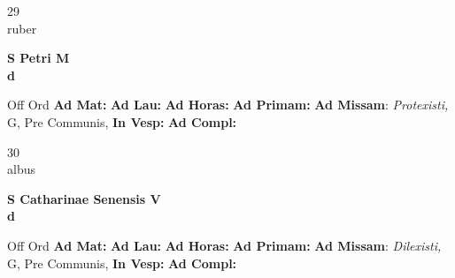 \documentclass[10pt, openany]{book}
\begin{document}
    \begin{center}
        \begin{minipage}{3.5in}
            \vspace{2em}
            \begin{minipage}{0.5in}
                {\Huge 29} \\
                {\normalsize ruber}
            \end{minipage}
            \begin{minipage}{3.0in}
                \textbf{ \large S Petri M \\
                \textnormal{\normalsize d}}

            \end{minipage}
            \begin{justify}Off Ord
                \textbf{Ad Mat: }
                \textbf{Ad Lau: }
                \textbf{Ad Horas: }
                \textbf{Ad Primam: }\textbf{Ad Missam}: \textit{Protexisti,} G, Pre Communis, 
                \textbf{In Vesp: }
                \textbf{Ad Compl: }
            \end{justify}
        \end{minipage}
    \end{center}

    \begin{center}
        \begin{minipage}{3.5in}
            \vspace{2em}
            \begin{minipage}{0.5in}
                {\Huge 30} \\
                {\normalsize albus}
            \end{minipage}
            \begin{minipage}{3.0in}
                \textbf{ \large S Catharinae Senensis V \\
                \textnormal{\normalsize d}}

            \end{minipage}
            \begin{justify}Off Ord
                \textbf{Ad Mat: }
                \textbf{Ad Lau: }
                \textbf{Ad Horas: }
                \textbf{Ad Primam: }\textbf{Ad Missam}: \textit{Dilexisti,} G, Pre Communis, 
                \textbf{In Vesp: }
                \textbf{Ad Compl: }
            \end{justify}
        \end{minipage}
    \end{center}
\end{document}
